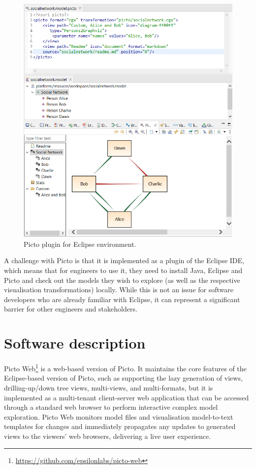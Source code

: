 \documentclass[preprint,12pt, a4paper]{elsarticle}
\begin{document}
\begin{figure}
	\centering
	\includegraphics[width=\linewidth]{images/picto-eclipse.png}
	\caption{Picto plugin for Eclipse environment.
	}
	\label{fig:picto-eclipse}
\end{figure}

A challenge with Picto is that it is implemented as a plugin of the Eclipse IDE, which means that for engineers to use it, they need to install Java, Eclipse and Picto and check out the models they wish to explore (as well as the respective visualisation transformations) locally. While this is not an issue for software developers who are already familiar with Eclipse, it can represent a significant barrier for other engineers and stakeholders. 

\section{Software description}
Picto Web\footnote{\url{https://github.com/epsilonlabs/picto-web}} is a web-based version of Picto. 
It maintains the core features of the Eclipse-based version of Picto, such as supporting the lazy generation of views, drilling-up/down tree views, multi-views, and multi-formats, but it is implemented as a multi-tenant client-server web application that can be accessed through a standard web browser to perform interactive complex model exploration. 
Picto Web monitors model files and visualisation model-to-text templates for changes and immediately propagates any updates to generated views to the viewers' web browsers, delivering a live user experience.
\end{document}
